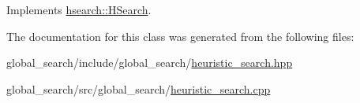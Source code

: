 Implements \hyperlink{classhsearch_1_1HSearch_a5d325955c4faedaca0c68155fd1f7e69}{hsearch\+::\+H\+Search}.



The documentation for this class was generated from the following files\+:\begin{DoxyCompactItemize}
\item 
global\+\_\+search/include/global\+\_\+search/\hyperlink{heuristic__search_8hpp}{heuristic\+\_\+search.\+hpp}\item 
global\+\_\+search/src/global\+\_\+search/\hyperlink{heuristic__search_8cpp}{heuristic\+\_\+search.\+cpp}\end{DoxyCompactItemize}
